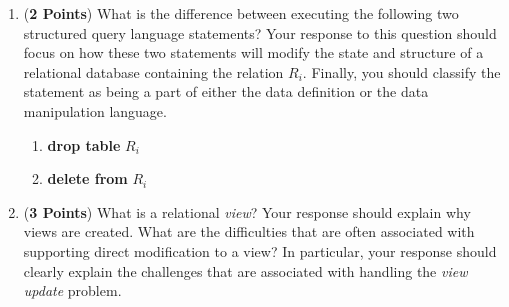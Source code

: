 \documentclass[12pt]{article}
\begin{document}
\begin{enumerate}
  \begin{enumerate}


  \item ({\bf 2 Points}) What is the difference between executing the
    following two structured query language statements?  Your response
    to this question should focus on how these two statements will
    modify the state and structure of a relational database containing
    the relation $R_i$.  Finally, you should classify the statement as
    being a part of either the data definition or the data
    manipulation language.

    \begin{enumerate}

    \item {\bf drop table} $R_i$

    \item {\bf delete from} $R_i$

    \end{enumerate}

  \item ({\bf 3 Points}) What is a relational {\em view}?  Your
    response should explain why views are created.  What are the
    difficulties that are often associated with supporting direct
    modification to a view?  In particular, your response should
    clearly explain the challenges that are associated with handling
    the {\em view update} problem.
    



\end{enumerate}
\end{enumerate}
\end{document}
